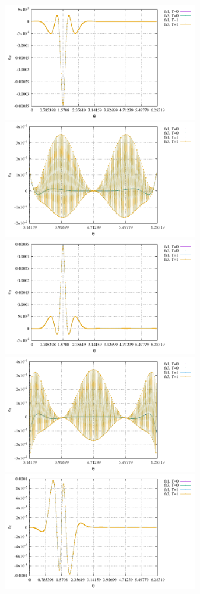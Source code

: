 \begin{center}
\includegraphics[width=8.5cm]{python_codes/fieldstone_151/results/test5/e_rr}
\includegraphics[width=8.5cm]{python_codes/fieldstone_151/results/test5/e_rr2}\\
\includegraphics[width=8.5cm]{python_codes/fieldstone_151/results/test5/e_tt}
\includegraphics[width=8.5cm]{python_codes/fieldstone_151/results/test5/e_tt2}\\
\includegraphics[width=8.5cm]{python_codes/fieldstone_151/results/test5/e_rt}

\end{center}
